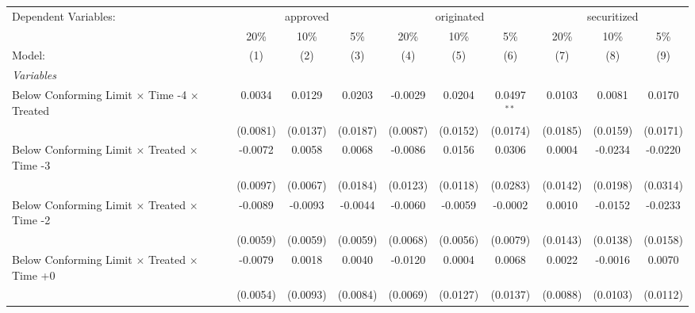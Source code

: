 \begingroup
\centering
\begin{tabular}{lccccccccc}
   \tabularnewline \midrule \midrule
   Dependent Variables: & \multicolumn{3}{c}{approved} & \multicolumn{3}{c}{originated} & \multicolumn{3}{c}{securitized}\\
                                                              & 20\%           & 10\%           & 5\%            & 20\%          & 10\%           & 5\%           & 20\%         & 10\%          & 5\% \\    
   Model:                                                     & (1)            & (2)            & (3)            & (4)           & (5)            & (6)           & (7)          & (8)           & (9)\\  
   \midrule
   \emph{Variables}\\
   Below Conforming Limit $\times$ Time -4 $\times$ Treated   & 0.0034         & 0.0129         & 0.0203         & -0.0029       & 0.0204         & 0.0497$^{**}$ & 0.0103       & 0.0081        & 0.0170\\   
                                                              & (0.0081)       & (0.0137)       & (0.0187)       & (0.0087)      & (0.0152)       & (0.0174)      & (0.0185)     & (0.0159)      & (0.0171)\\   
   Below Conforming Limit $\times$ Treated $\times$ Time -3   & -0.0072        & 0.0058         & 0.0068         & -0.0086       & 0.0156         & 0.0306        & 0.0004       & -0.0234       & -0.0220\\   
                                                              & (0.0097)       & (0.0067)       & (0.0184)       & (0.0123)      & (0.0118)       & (0.0283)      & (0.0142)     & (0.0198)      & (0.0314)\\   
   Below Conforming Limit $\times$ Treated $\times$ Time -2   & -0.0089        & -0.0093        & -0.0044        & -0.0060       & -0.0059        & -0.0002       & 0.0010       & -0.0152       & -0.0233\\   
                                                              & (0.0059)       & (0.0059)       & (0.0059)       & (0.0068)      & (0.0056)       & (0.0079)      & (0.0143)     & (0.0138)      & (0.0158)\\   
   Below Conforming Limit $\times$ Treated $\times$ Time +0   & -0.0079        & 0.0018         & 0.0040         & -0.0120       & 0.0004         & 0.0068        & 0.0022       & -0.0016       & 0.0070\\   
                                                              & (0.0054)       & (0.0093)       & (0.0084)       & (0.0069)      & (0.0127)       & (0.0137)      & (0.0088)     & (0.0103)      & (0.0112)\\   

\end{tabular}
